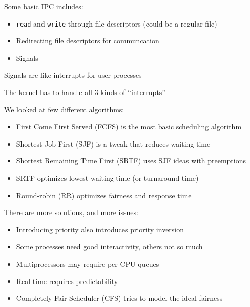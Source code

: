   \begin{slide}


    Some basic IPC includes:
    \begin{itemize}
      \item \texttt{read} and \texttt{write} through file descriptors (could be a regular file)
      \item Redirecting file descriptors for communcation
      \item Signals
    \end{itemize}
    \medskip

    Signals are like interrupts for user processes

    \leftspace{}The kernel has to handle all 3 kinds of ``interrupts''

  \end{slide}

  \begin{slide}


    We looked at few different algorithms:

    \begin{itemize}
      \item First Come First Served (FCFS) is the most basic scheduling algorithm
      \item Shortest Job First (SJF) is a tweak that reduces waiting time
      \item Shortest Remaining Time First (SRTF) uses SJF ideas with preemptions
      \item SRTF optimizes lowest waiting time (or turnaround time)
      \item Round-robin (RR) optimizes fairness and response time
    \end{itemize}

  \end{slide}

  \begin{slide}


    There are more solutions, and more issues:

    \begin{itemize}
      \item Introducing priority also introduces priority inversion
      \item Some processes need good interactivity, others not so much
      \item Multiprocessors may require per-CPU queues
      \item Real-time requires predictability
      \item Completely Fair Scheduler (CFS) tries to model the ideal fairness
    \end{itemize}

  \end{slide}


